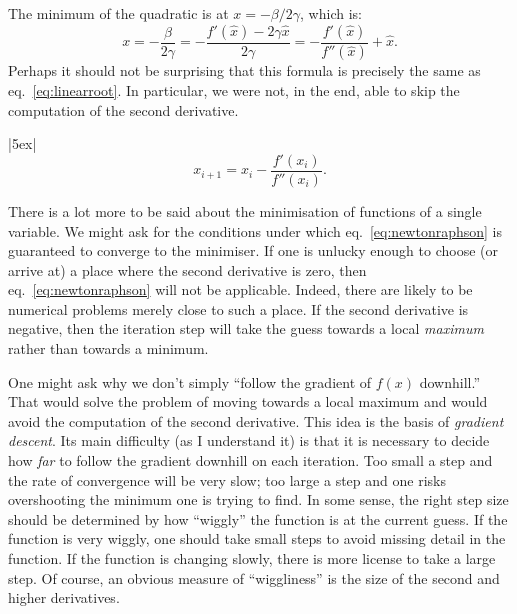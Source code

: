 \documentclass[10pt, a4paper]{article}
\begin{document}
The minimum of the quadratic is at $x=-\beta/2\gamma$, which is:
\begin{equation*}
  x = -\frac{\beta}{2\gamma}
  = -\frac{f'(\hat{x})-2\gamma\hat{x}}{2\gamma}
  = -\frac{f'(\hat{x})}{f''(\hat{x})} +\hat{x}. 
\end{equation*}
Perhaps it should not be surprising that this formula is precisely the
same as eq.~\eqref{eq:linearroot}. In particular, we were not, in the
end, able to skip the computation of the second derivative.

\begin{marginfigure}|5ex|
  \begin{equation*}
    x_{i+1} = x_i - \frac{f'(x_i)}{f''(x_i)}.
  \end{equation*}
\end{marginfigure}
There is a lot more to be said about the minimisation of functions of
a single variable. We might ask for the conditions under which
eq.~\eqref{eq:newtonraphson} is guaranteed to converge to the
minimiser. If one is unlucky enough to choose (or arrive at) a place
where the second derivative is zero, then eq.~\eqref{eq:newtonraphson}
will not be applicable. Indeed, there are likely to be numerical
problems merely close to such a place. If the second derivative is
negative, then the iteration step will take the guess towards a local
\emph{maximum} rather than towards a minimum.

One might ask why we don't simply ``follow the gradient of $f(x)$
downhill.'' That would solve the problem of moving towards a local
maximum and would avoid the computation of the second derivative. This
idea is the basis of \emph{gradient descent}. Its main difficulty (as
I understand it) is that it is necessary to decide how \emph{far} to
follow the gradient downhill on each iteration. Too small a step and
the rate of convergence will be very slow; too large a step and one
risks overshooting the minimum one is trying to find. In some sense,
the right step size should be determined by how “wiggly” the function
is at the current guess. If the function is very wiggly, one should
take small steps to avoid missing detail in the function. If the
function is changing slowly, there is more license to take a large
step. Of course, an obvious measure of “wiggliness” is the size of the
second and higher derivatives.
\end{document}
